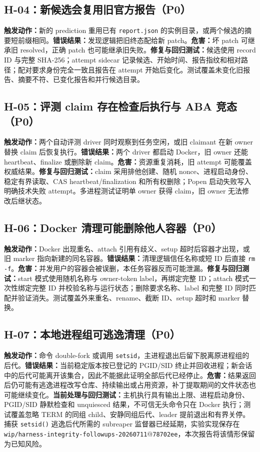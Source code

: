 \documentclass[11pt,a4paper,fontset=fandol]{ctexart}
\newcommand{\code}[1]{\texttt{#1}}
\begin{document}
\subsection{H-04：新候选会复用旧官方报告（P0）}

\textbf{触发动作：}新的 prediction 重用已有 \code{report.json} 的实例目录，或两个候选的摘要短前缀相同。\textbf{错误结果：}发现逻辑把旧终态配给新 patch。\textbf{危害：}坏 patch 可继承旧 resolved，正确 patch 也可能继承旧失败。\textbf{修复与回归测试：}候选使用 record ID 与完整 SHA-256；attempt sidecar 记录候选、开始时间、报告指纹和相对路径；配对要求身份完全一致且报告在 attempt 开始后变化。测试覆盖未变化旧报告、摘要不符、已变化报告和并行候选目录。

\subsection{H-05：评测 claim 存在检查后执行与 ABA 竞态（P0）}

\textbf{触发动作：}两个自动评测 driver 同时观察到任务空闲，或旧 claimant 在新 owner 替换 claim 后恢复执行。\textbf{错误结果：}两个 driver 都启动 Docker，旧 owner 还能 heartbeat、finalize 或删除新 claim。\textbf{危害：}资源重复消耗，旧 attempt 可能覆盖权威结果。\textbf{修复与回归测试：}claim 采用排他创建、随机 nonce、进程启动身份、稳定有界读取、CAS heartbeat/finalization 和所有权删除；Popen 启动失败写入明确技术失败 attempt。多进程测试证明单 owner 获得 claim，旧 owner 无法修改后继状态。

\subsection{H-06：Docker 清理可能删除他人容器（P0）}

\textbf{触发动作：}Docker 出现重名、attach 引用有歧义、setup 超时后容器才出现，或旧 marker 指向新建的同名容器。\textbf{错误结果：}清理逻辑信任名称或短 ID 后直接 \code{rm -f}。\textbf{危害：}并发用户的容器会被误删，本任务容器反而可能泄漏。\textbf{修复与回归测试：}start 模式使用随机名称与 owner-token label，再绑定完整 ID；attach 模式一次性绑定完整 ID 并校验名称与运行状态；删除要求名称、label 和完整 ID 同时匹配并验证消失。测试覆盖外来重名、rename、截断 ID、setup 超时和 marker 替换。

\subsection{H-07：本地进程组可逃逸清理（P0）}

\textbf{触发动作：}命令 double-fork 或调用 \code{setsid}，主进程退出后留下脱离原进程组的后代。\textbf{错误结果：}当前稳定版本按已登记的 PGID/SID 终止并回收进程；新会话中的后代可能离开该集合，因此不能据此证明全部后代已经停止。\textbf{危害：}结果返回后仍可能有逃逸进程改写仓库、持续输出或占用资源，补丁提取期间的文件状态也可能继续变化。\textbf{当前处理与回归测试：}主机执行具有输出上限、进程启动身份、PGID/SID 静默检查和 unquiesced 结果，不可信无头命令只在 Docker 执行；测试覆盖忽略 TERM 的同组 child、安静同组后代、leader 提前退出和有界关停。捕获 \code{setsid()} 逃逸后代所需的 subreaper 监督器已经延期，实验实现保存在 \code{wip/harness-integrity-followups-20260711}@\code{78702ee}，本次报告将该情形保留为已知风险。
\end{document}
